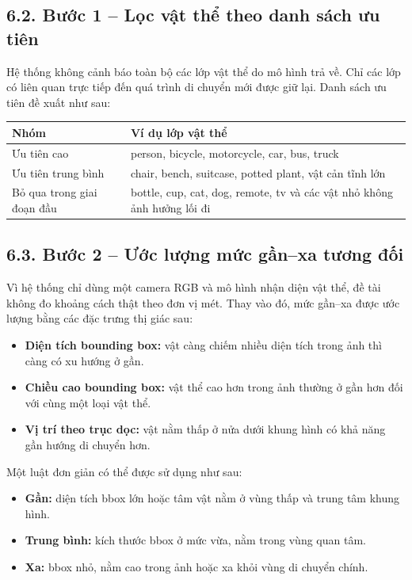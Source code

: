 \documentclass[11pt, a4paper]{article}
\begin{document}
\subsection*{6.2. Bước 1 -- Lọc vật thể theo danh sách ưu tiên}
Hệ thống không cảnh báo toàn bộ các lớp vật thể do mô hình trả về. Chỉ các lớp có liên quan trực tiếp đến quá trình di chuyển mới được giữ lại. Danh sách ưu tiên đề xuất như sau:

\begin{center}
\begin{tabularx}{0.96\textwidth}{|>{\raggedright\arraybackslash}p{3cm}|X|}
\hline
\textbf{Nhóm} & \textbf{Ví dụ lớp vật thể} \\ \hline
Ưu tiên cao & person, bicycle, motorcycle, car, bus, truck \\ \hline
Ưu tiên trung bình & chair, bench, suitcase, potted plant, vật cản tĩnh lớn \\ \hline
Bỏ qua trong giai đoạn đầu & bottle, cup, cat, dog, remote, tv và các vật nhỏ không ảnh hưởng lối đi \\ \hline
\end{tabularx}
\end{center}

\subsection*{6.3. Bước 2 -- Ước lượng mức gần--xa tương đối}
Vì hệ thống chỉ dùng một camera RGB và mô hình nhận diện vật thể, đề tài không đo khoảng cách thật theo đơn vị mét. Thay vào đó, mức gần--xa được ước lượng bằng các đặc trưng thị giác sau:
\begin{itemize}
    \item \textbf{Diện tích bounding box:} vật càng chiếm nhiều diện tích trong ảnh thì càng có xu hướng ở gần.
    \item \textbf{Chiều cao bounding box:} vật thể cao hơn trong ảnh thường ở gần hơn đối với cùng một loại vật thể.
    \item \textbf{Vị trí theo trục dọc:} vật nằm thấp ở nửa dưới khung hình có khả năng gần hướng di chuyển hơn.
\end{itemize}

Một luật đơn giản có thể được sử dụng như sau:
\begin{itemize}
    \item \textbf{Gần:} diện tích bbox lớn hoặc tâm vật nằm ở vùng thấp và trung tâm khung hình.
    \item \textbf{Trung bình:} kích thước bbox ở mức vừa, nằm trong vùng quan tâm.
    \item \textbf{Xa:} bbox nhỏ, nằm cao trong ảnh hoặc xa khỏi vùng di chuyển chính.
\end{itemize}
\end{document}
